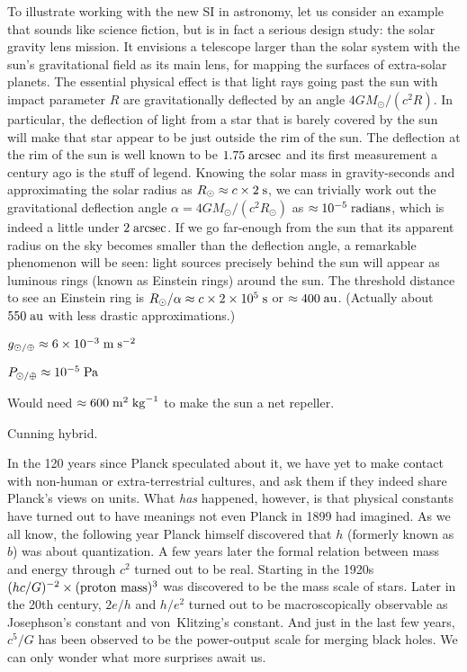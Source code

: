 \documentclass[aps,prb,12pt]{revtex4-1}
\def\unit#1{\;{\rm#1}}
\begin{document}
To illustrate working with the new SI in astronomy, let us consider an
example that sounds like science fiction, but is in fact a serious
design study: the solar gravity lens
mission.\cite{2020arXiv200211871T} It envisions a telescope larger
than the solar system with the sun's gravitational field as its main
lens, for mapping the surfaces of extra-solar planets.  The essential
physical effect is that light rays going past the sun with impact
parameter $R$ are gravitationally deflected by an angle
$4GM_\odot/(c^2 R)$.  In particular, the deflection of light from a
star that is barely covered by the sun will make that star appear to
be just outside the rim of the sun.  The deflection at the rim of the
sun is well known to be $1.75\unit{arcsec}$ and its first measurement
a century ago is the stuff of legend.\cite{Kennefick2012} Knowing the
solar mass in gravity-seconds and approximating the solar radius as
$R_\odot\approx c\times2\unit{s}$, we can trivially work out the
gravitational deflection angle $\alpha=4GM_\odot/(c^2 R_\odot)$ as
$\approx10^{-5}\unit{radians}$, which is indeed a little under
$2\unit{arcsec}$.  If we go far-enough from the sun that its apparent
radius on the sky becomes smaller than the deflection angle, a
remarkable phenomenon will be seen: light sources precisely behind the
sun will appear as luminous rings (known as Einstein rings) around the
sun.  The threshold distance to see an Einstein ring is
$R_\odot/\alpha\approx c\times2\times10^5\unit{s}$ or $\approx
400\unit{au}$.  (Actually about $550\unit{au}$ with less drastic
approximations.)

$g_{\odot/\oplus} \approx 6\times10^{-3}\unit{m}\unit{s}^{-2}$

$P_{\odot/\oplus} \approx 10^{-5}\unit{Pa}$

Would need $\approx 600\unit{m}^2\unit{kg}^{-1}$ to make the sun a
net repeller.

Cunning hybrid.

In the 120 years since Planck speculated about it, we have yet to make
contact with non-human or extra-terrestrial cultures, and ask them if
they indeed share Planck's views on units.  What {\em has} happened,
however, is that physical constants have turned out to have meanings
not even Planck in 1899 had imagined.  As we all know, the following
year Planck himself discovered that $h$ (formerly known as $b$) was
about quantization.  A few years later the formal relation between
mass and energy through $c^2$ turned out to be real.  Starting in the
1920s $(hc/G)^{-2}\times(\hbox{proton mass})^3$ was
discovered to be the mass scale of stars.  Later in the 20th century,
$2e/h$ and $h/e^2$ turned out to be macroscopically observable as
Josephson's constant and von~Klitzing's constant.  And just in the
last few years, $c^5/G$ has been observed to be the power-output scale
for merging black holes.  We can only wonder what more surprises await
us.

\def\aj{AJ}
\def\apjl{ApJL}
\def\aap{A\&A}
\def\mnras{MNRAS}
\def\pasp{PASP}


%

\end{document}
